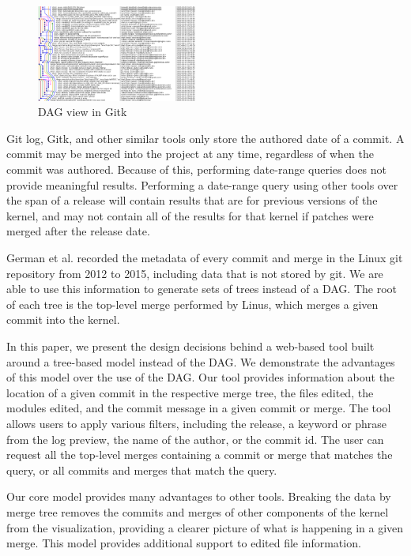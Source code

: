 \documentclass[conference, draftclsnofoot]{IEEEtran}
\begin{document}
\begin{figure}
	\centering
	\includegraphics[width=0.47\textwidth]{figures/gitk.png}
	\caption{DAG view in Gitk}
	\label{fig:gitk}
\end{figure}

Git log, Gitk, and other similar tools only store the authored date of a
commit. A commit may be merged into the project at any time, regardless of when
the commit was authored. Because of this, performing date-range queries does
not provide meaningful results. Performing a date-range query using other tools
over the span of a release will contain results that are for previous versions
of the kernel, and may not contain all of the results for that kernel if
patches were merged after the release date.

German et al. recorded the metadata of every commit and merge in the Linux git
repository from 2012 to 2015, including data that is not stored by git. We are
able to use this information to generate sets of trees instead of a DAG. The
root of each tree is the top-level merge performed by Linus, which merges a
given commit into the kernel.

In this paper, we present the design decisions behind a web-based tool built
around a tree-based model instead of the DAG. We demonstrate the advantages of
this model over the use of the DAG. Our tool provides information about the
location of a given commit in the respective merge tree, the files edited, the
modules edited, and the commit message in a given commit or merge. The tool
allows users to apply various filters, including the release, a keyword or
phrase from the log preview, the name of the author, or the commit id. The user
can request all the top-level merges containing a commit or merge that matches
the query, or all commits and merges that match the query.

Our core model provides many advantages to other tools. Breaking the data by
merge tree removes the commits and merges of other components of the kernel
from the visualization, providing a clearer picture of what is happening in a
given merge. This model provides additional support to edited file information.
\end{document}
